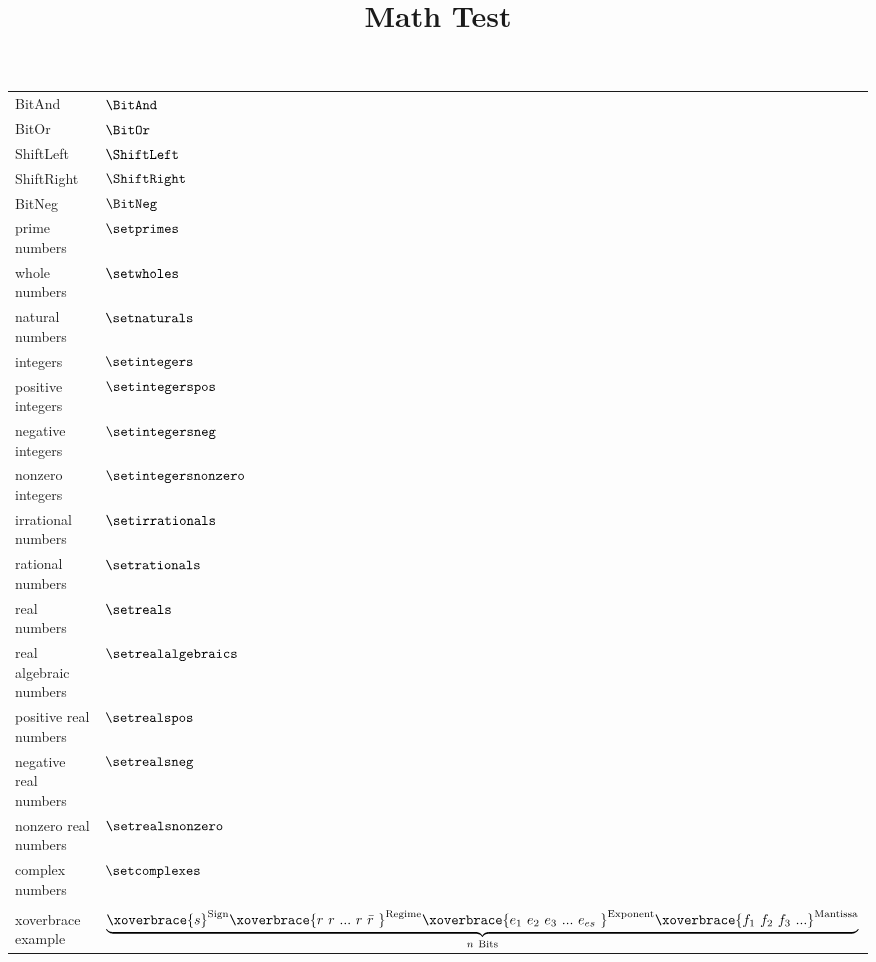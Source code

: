 \documentclass{article}
\title{Math Test}
\begin{document}
    \maketitle

    \begin{tabular}{l|l}
        BitAnd & $\BitAnd$ \\
        BitOr & $\BitOr$ \\
        ShiftLeft & $\ShiftLeft$ \\
        ShiftRight & $\ShiftRight$ \\
        BitNeg & $\BitNeg$ \\
        prime numbers & $\setprimes$ \\
        whole numbers & $\setwholes$ \\
        natural numbers & $\setnaturals$ \\
        integers & $\setintegers$ \\
        positive integers & $\setintegerspos$ \\
        negative integers & $\setintegersneg$ \\
        nonzero integers & $\setintegersnonzero$ \\
        irrational numbers & $\setirrationals$ \\
        rational numbers & $\setrationals$ \\
        real numbers & $\setreals$ \\
        real algebraic numbers & $\setrealalgebraics$ \\
        positive real numbers & $\setrealspos$ \\
        negative real numbers & $\setrealsneg$ \\
        nonzero real numbers & $\setrealsnonzero$ \\
        complex numbers & $\setcomplexes$ \\\\
        xoverbrace example & $
        \underbrace{
            \xoverbrace{s}                      ^\textup{Sign}
            \xoverbrace{r~r~...~r~\bar{r}~}     ^\textup{Regime}
            \xoverbrace{e_1~e_2~e_3~...~e_{es}~}^\textup{Exponent}
            \xoverbrace{f_1~f_2~f_3~...}        ^\textup{Mantissa}
        }_{n~\textup{Bits}}
        $
    \end{tabular}
\end{document}
